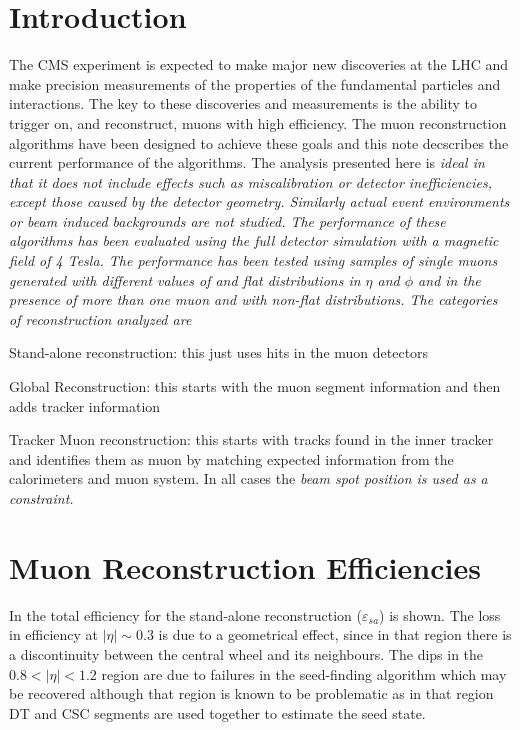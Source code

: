 \section{Introduction}\label{sec:intro}
The CMS experiment is expected to make major new discoveries at the LHC
 and make precision measurements of the properties of the fundamental
 particles and interactions. The key to these discoveries and
 measurements is the ability to trigger on, and reconstruct, muons with
 high efficiency. The muon reconstruction algorithms have been designed
 to achieve these goals and this note decscribes the current performance
 of the algorithms. The analysis presented here is \it ideal \rm in that
 it does not include effects such as miscalibration or
 detector inefficiencies, except those caused by the detector
 geometry. Similarly actual event environments or beam induced
 backgrounds are not studied.  The performance of these
 algorithms has been evaluated using the full detector simulation with a
 magnetic field of 4 Tesla. The performance has been tested using
 samples of single muons generated with different values of \pt{} and
 flat distributions in $\eta$ and $\phi$ and in the presence of more
 than one muon and with non-flat distributions.  The categories of
 reconstruction analyzed are \bi
\item Stand-alone reconstruction: this just uses hits in the muon detectors
\item Global Reconstruction: this starts with the muon segment information and then adds tracker information
\item Tracker Muon reconstruction: this starts with tracks found in
  the inner tracker and identifies them as muon 
by matching expected information from the calorimeters and muon system.
\ei 
In all cases the \it beam \rm spot position is used as a constraint.
 
\section{Muon Reconstruction Efficiencies}\label{sec:efficiencies}
In  the total efficiency for the
stand-alone reconstruction ($\varepsilon_{sa}$) is shown. The loss in
efficiency at $|\eta| \sim 0.3$ is due to a geometrical effect, since in
that region there is a discontinuity between the central wheel and its
neighbours.  The dips in the $0.8 < |\eta| < 1.2$ region are due to
failures in the seed-finding algorithm which may be recovered although
that region is known to be problematic as in that region DT and CSC
segments are used together to estimate the seed state.

